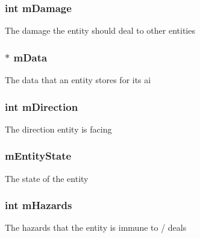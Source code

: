 \subsubsection[{\texorpdfstring{m\+Damage}{mDamage}}]{\setlength{\rightskip}{0pt plus 5cm}int m\+Damage}\hypertarget{structentity__s_a890d42df13307b51280d145a6b05211d}{}\label{structentity__s_a890d42df13307b51280d145a6b05211d}
The damage the entity should deal to other entities 
\subsubsection[{\texorpdfstring{m\+Data}{mData}}]{$\ast$ m\+Data}\hypertarget{structentity__s_af3ccc93f657a50bc80718e0fe9ad367f}{}\label{structentity__s_af3ccc93f657a50bc80718e0fe9ad367f}
The data that an entity stores for its ai 
\subsubsection[{\texorpdfstring{m\+Direction}{mDirection}}]{\setlength{\rightskip}{0pt plus 5cm}int m\+Direction}\hypertarget{structentity__s_ada44c567bee8dbfa47693d4068507cab}{}\label{structentity__s_ada44c567bee8dbfa47693d4068507cab}
The direction entity is facing 
\subsubsection[{\texorpdfstring{m\+Entity\+State}{mEntityState}}]{ m\+Entity\+State}\hypertarget{structentity__s_aa50a2f30db6a433d25f42fe58ee20995}{}\label{structentity__s_aa50a2f30db6a433d25f42fe58ee20995}
The state of the entity 
\subsubsection[{\texorpdfstring{m\+Hazards}{mHazards}}]{\setlength{\rightskip}{0pt plus 5cm}int m\+Hazards}\hypertarget{structentity__s_a8c5ee6d8b825b6da8ab851320eccd45e}{}\label{structentity__s_a8c5ee6d8b825b6da8ab851320eccd45e}
The hazards that the entity is immune to / deals 
